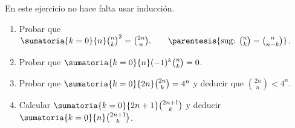 \begin{enunciado}{\ejercicio}
  En este ejercicio no hace falta usar inducción.
  \begin{enumerate}[label=\alph*)]
    \item Probar que $\sumatoria{k = 0}{n} \binom{n}{k}^2 = \binom{2n}{n}. \qquad \parentesis{\text{sug: } \binom{n}{k} = \binom{n}{n-k}}$.
    \item Probar que $\sumatoria{k = 0}{n} (-1)^k \binom{n}{k} = 0$.
    \item Probar que $\sumatoria{k = 0}{2n} \binom{2n}{k} = 4^n$ y deducir que $\binom{2n}{n} < 4^n$.
    \item Calcular $\sumatoria{k = 0}{2n+1} \binom{2n+1}{k}$ y deducir $\sumatoria{k=0}{n} \binom{2n+1}{k}$.
  \end{enumerate}
\end{enunciado}

